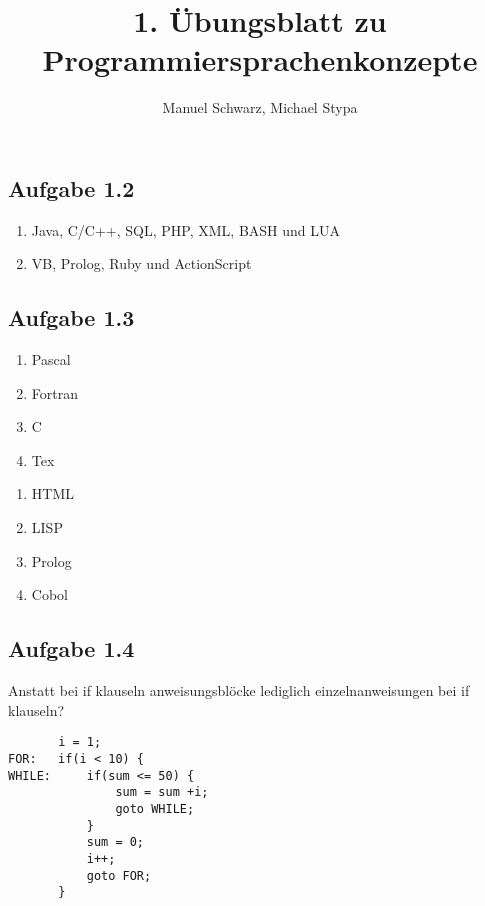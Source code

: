 \documentclass[a4paper,11pt]{article}
\title{1. Übungsblatt zu Programmiersprachenkonzepte}
\author{Manuel Schwarz, Michael Stypa}
\begin{document}
\maketitle

\subsection*{Aufgabe 1.2}
\begin{enumerate}[label=\alph*)]
  \item Java, C/C++, SQL, PHP, XML, BASH und LUA
  \item VB, Prolog, Ruby und ActionScript
\end{enumerate}

\bigskip

\subsection*{Aufgabe 1.3}
\begin{minipage}{.4\linewidth}
  \begin{enumerate}
    \item Pascal
    \item Fortran
    \item C
    \item Tex
  \end{enumerate}
\end{minipage}
\hspace{.1\linewidth}
\begin{minipage}{.4\linewidth}
  \begin{enumerate}[start=5]
    \item HTML
    \item LISP
    \item Prolog
    \item Cobol
  \end{enumerate}
\end{minipage}

\bigskip

\subsection*{Aufgabe 1.4}
Anstatt bei if klauseln anweisungsblöcke lediglich einzelnanweisungen bei if klauseln?
\begin{lstlisting}
       i = 1;
FOR:   if(i < 10) {
WHILE:     if(sum <= 50) {
               sum = sum +i;
               goto WHILE;
           }
           sum = 0;
           i++;
           goto FOR;
       }
\end{lstlisting}
\end{document}
